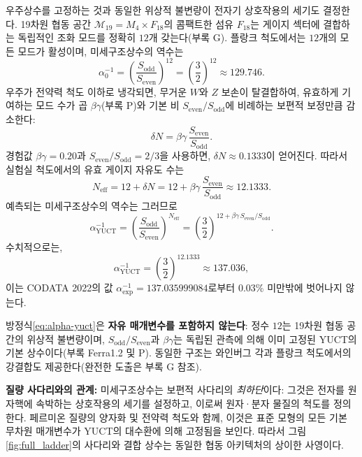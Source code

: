 \documentclass[12pt,a4paper]{article}
\begin{document}
	우주상수를 고정하는 것과 동일한 위상적 불변량이 전자기 상호작용의 세기도 결정한다. 19차원 협동 공간 \(\mathcal{M}_{19}=M_4\times F_{18}\)의 콤팩트한 섬유 \(F_{18}\)는 게이지 섹터에 결합하는 독립적인 조화 모드를 정확히 \(12\)개 갖는다(부록 G). 플랑크 척도에서는 \(12\)개의 모든 모드가 활성이며, 미세구조상수의 역수는
	\begin{equation}
		\alpha_0^{-1} = \left(\frac{S_{\mathrm{odd}}}{S_{\mathrm{even}}}\right)^{12}
		= \left(\frac{3}{2}\right)^{12} \approx 129.746 .
	\end{equation}
	우주가 전약력 척도 이하로 냉각되면, 무거운 \(W\)와 \(Z\) 보손이 탈결합하여, 유효하게 기여하는 모드 수가 곱 \(\beta\gamma\)(부록 P)와 기본 비 \(S_{\mathrm{even}}/S_{\mathrm{odd}}\)에 비례하는 보편적 보정만큼 감소한다:
	\begin{equation}
		\delta N = \beta\gamma \, \frac{S_{\mathrm{even}}}{S_{\mathrm{odd}}} .
	\end{equation}
	경험값 \(\beta\gamma = 0.20\)과 \(S_{\mathrm{even}}/S_{\mathrm{odd}} = 2/3\)을 사용하면, \(\delta N \approx 0.1333\)이 얻어진다. 따라서 실험실 척도에서의 유효 게이지 자유도 수는
	\begin{equation}
		N_{\mathrm{eff}} = 12 + \delta N = 12 + \beta\gamma\,\frac{S_{\mathrm{even}}}{S_{\mathrm{odd}}}
		\approx 12.1333 .
	\end{equation}
	예측되는 미세구조상수의 역수는 그러므로
	\begin{equation}
		\boxed{\alpha^{-1}_{\mathrm{YUCT}} =
			\left(\frac{S_{\mathrm{odd}}}{S_{\mathrm{even}}}\right)^{N_{\mathrm{eff}}}
			= \left(\frac{3}{2}\right)^{12 + \beta\gamma\,S_{\mathrm{even}}/S_{\mathrm{odd}}} } .
		\label{eq:alpha-yuct}
	\end{equation}
	수치적으로는,
	\[
	\alpha^{-1}_{\mathrm{YUCT}} = \left(\frac{3}{2}\right)^{12.1333} \approx 137.036 ,
	\]
	이는 CODATA 2022의 값 \(\alpha^{-1}_{\mathrm{exp}} = 137.035999084\)로부터 \(0.03\%\) 미만밖에 벗어나지 않는다.
	
	방정식\eqref{eq:alpha-yuct}은 \textbf{자유 매개변수를 포함하지 않는다}: 정수 \(12\)는 19차원 협동 공간의 위상적 불변량이며, \(S_{\mathrm{odd}}/S_{\mathrm{even}}\)과 \(\beta\gamma\)는 독립된 관측에 의해 이미 고정된 YUCT의 기본 상수이다(부록 Ferra1.2 및 P). 동일한 구조는 와인버그 각과 플랑크 척도에서의 강결합도 제공한다(완전한 도출은 부록 G 참조).
	
	\textbf{질량 사다리와의 관계:} 미세구조상수는 보편적 사다리의 \textit{최하단}이다: 그것은 전자를 원자핵에 속박하는 상호작용의 세기를 설정하고, 이로써 원자·분자 물질의 척도를 정의한다. 페르미온 질량의 양자화 및 전약력 척도와 함께, 이것은 표준 모형의 모든 기본 무차원 매개변수가 YUCT의 대수환에 의해 고정됨을 보인다. 따라서 그림\ref{fig:full_ladder}의 사다리와 결합 상수는 동일한 협동 아키텍처의 상이한 사영이다.
	
\end{document}
